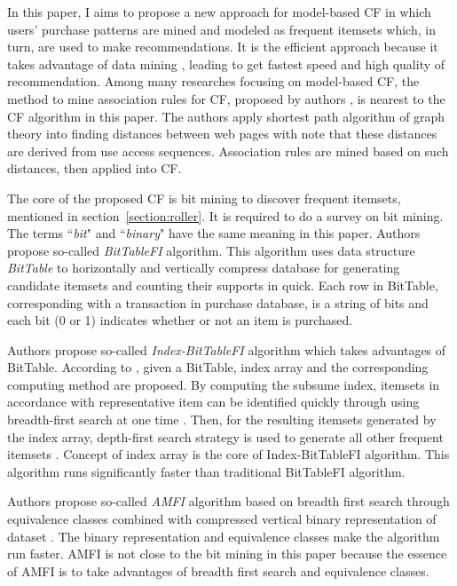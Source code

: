 \documentclass{sig-alternate}
\begin{document}
In this paper, I aims to propose a new approach for model-based CF in which users' purchase patterns are mined and modeled as frequent itemsets which, in turn, are used to make recommendations. It is the efficient approach because it takes advantage of data mining \cite[pp.~227-250]{han:datamining}, leading to get fastest speed and high quality of recommendation. Among many researches focusing on model-based CF, the method to mine association rules for CF, proposed by authors \cite{shyu:associationrules}, is nearest to the CF algorithm in this paper. The authors \cite{shyu:associationrules} apply shortest path algorithm of graph theory into finding distances between web pages with note that these distances are derived from use access sequences. Association rules are mined based on such distances, then applied into CF.

The core of the proposed CF is bit mining to discover frequent itemsets, mentioned in section~\ref{section:roller}. It is required to do a survey on bit mining. The terms ``\textit{bit}" and ``\textit{binary}" have the same meaning in this paper.
Authors \cite{dong:bittablefi} propose so-called \textit{BitTableFI} algorithm. This algorithm uses data structure \textit{BitTable} to horizontally and vertically compress database for generating candidate itemsets and counting their supports in quick. Each row in BitTable, corresponding with a transaction in purchase database, is a string of bits and each bit (0 or 1) indicates whether or not an item is purchased.

Authors \cite{song:indexbittablefi} propose so-called \textit{Index-BitTableFI} algorithm which takes advantages of BitTable. According to \cite[p.~508]{song:indexbittablefi}, given a BitTable, index array and the corresponding computing method are proposed. By computing the subsume index, itemsets in accordance with representative item can be identified quickly through using breadth-first search at one time \cite[p.~509]{song:indexbittablefi}. Then, for the resulting itemsets generated by the index array, depth-first search strategy is used to generate all other frequent itemsets \cite[p.~510]{song:indexbittablefi}. Concept of index array is the core of Index-BitTableFI algorithm. This algorithm runs significantly faster than traditional BitTableFI algorithm.

Authors \cite{leon:compression} propose so-called \textit{AMFI} algorithm based on breadth first search through equivalence classes combined with compressed vertical binary representation of dataset \cite[p.~486]{leon:compression}. The binary representation and equivalence classes make the algorithm run faster. AMFI is not close to the bit mining in this paper because the essence of AMFI is to take advantages of breadth first search and equivalence classes.
\end{document}
